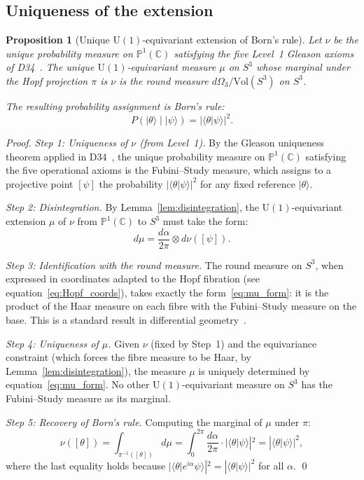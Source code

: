 \documentclass[12pt,a4paper]{article}
\newtheorem{proposition}[theorem]{Proposition}
\newcommand{\pket}[1]{|#1\rangle}
\newcommand{\CC}{\mathbb{C}}
\newcommand{\PP}{\mathbb{P}}
\begin{document}
\subsection{Uniqueness of the extension}

\begin{proposition}[Unique $\mathrm{U}(1)$-equivariant extension of Born's rule]
\label{prop:P3}
Let $\nu$ be the unique probability measure on $\PP^1(\CC)$ satisfying the five
Level~1 Gleason axioms of D34~\cite{PDL_D34_2026}. The unique $\mathrm{U}(1)$-equivariant
measure $\mu$ on $S^3$ whose marginal under the Hopf projection $\pi$ is $\nu$ is the
round measure $d\Omega_3 / \mathrm{Vol}(S^3)$ on $S^3$.

The resulting probability assignment is Born's rule:
\begin{equation}
P(\pket{\theta} \mid \pket{\psi}) = |\langle\theta|\psi\rangle|^2.
\label{eq:born_complete}
\end{equation}
\end{proposition}

\begin{proof}
\emph{Step 1: Uniqueness of $\nu$ (from Level~1).} By the Gleason uniqueness theorem
applied in D34~\cite{PDL_D34_2026}, the unique probability measure on $\PP^1(\CC)$
satisfying the five operational axioms is the Fubini--Study measure, which assigns
to a projective point $[\psi]$ the probability $|\langle\theta|\psi\rangle|^2$ for
any fixed reference $\pket{\theta}$.

\emph{Step 2: Disintegration.} By Lemma~\ref{lem:disintegration}, the $\mathrm{U}(1)$-equivariant
extension $\mu$ of $\nu$ from $\PP^1(\CC)$ to $S^3$ must take the form:
\begin{equation}
d\mu = \frac{d\alpha}{2\pi} \otimes d\nu([\psi]).
\label{eq:mu_form}
\end{equation}

\emph{Step 3: Identification with the round measure.} The round measure on $S^3$,
when expressed in coordinates adapted to the Hopf fibration
(see equation~\eqref{eq:Hopf_coords}), takes exactly the form~\eqref{eq:mu_form}:
it is the product of the Haar measure on each fibre with the Fubini--Study measure
on the base. This is a standard result in differential geometry~\cite{Hopf_1931}.

\emph{Step 4: Uniqueness of $\mu$.} Given $\nu$ (fixed by Step~1) and the
equivariance constraint (which forces the fibre measure to be Haar, by
Lemma~\ref{lem:disintegration}), the measure $\mu$ is uniquely determined by
equation~\eqref{eq:mu_form}. No other $\mathrm{U}(1)$-equivariant measure on $S^3$
has the Fubini--Study measure as its marginal.

\emph{Step 5: Recovery of Born's rule.} Computing the marginal of $\mu$ under $\pi$:
\begin{equation}
\nu([\theta]) = \int_{\pi^{-1}([\theta])} d\mu
= \int_0^{2\pi} \frac{d\alpha}{2\pi} \cdot |\langle\theta|\psi\rangle|^2
= |\langle\theta|\psi\rangle|^2,
\label{eq:born_from_marginal}
\end{equation}
where the last equality holds because $|\langle\theta|e^{i\alpha}\psi\rangle|^2 =
|\langle\theta|\psi\rangle|^2$ for all $\alpha$. \qed
\end{proof}
\end{document}
